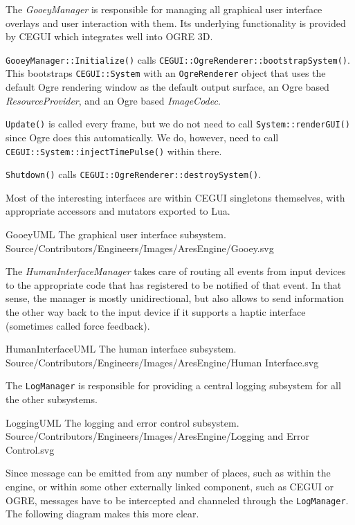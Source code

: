 \page 
{}
The {\it GooeyManager} is responsible for managing all graphical user interface overlays and user interaction with them. Its underlying functionality is provided by CEGUI which integrates well into OGRE 3D.

{\tt GooeyManager::Initialize()} calls {\tt CEGUI::OgreRenderer::bootstrapSystem()}. This bootstraps {\tt CEGUI::System} with an {\tt OgreRenderer} object that uses the default Ogre rendering window as the default output surface, an Ogre based {\it ResourceProvider}, and an Ogre based {\it ImageCodec}.

{\tt Update()} is called every frame, but we do not need to call {\tt System::renderGUI()} since Ogre does this automatically. We do, however, need to call {\tt CEGUI::System::injectTimePulse()} within there.

{\tt Shutdown()} calls {\tt CEGUI::OgreRenderer::destroySystem()}.

Most of the interesting interfaces are within CEGUI singletons themselves, with appropriate accessors and mutators exported to Lua.

\FullPageDiagram
    {GooeyUML}
    {The graphical user interface subsystem.}
    {Source/Contributors/Engineers/Images/AresEngine/Gooey.svg}

\page 
{}
The {\it HumanInterfaceManager} takes care of routing all events from input devices to the appropriate code that has registered to be notified of that event. In that sense, the manager is mostly unidirectional, but also allows to send information the other way back to the input device if it supports a haptic interface (sometimes called force feedback).

\FullPageDiagram
    {HumanInterfaceUML}
    {The human interface subsystem.}
    {Source/Contributors/Engineers/Images/AresEngine/Human Interface.svg}

\page 
{}
The {\tt LogManager} is responsible for providing a central logging subsystem for all the other subsystems.

\FullPageDiagram
    {LoggingUML}
    {The logging and error control subsystem.}
    {Source/Contributors/Engineers/Images/AresEngine/Logging and Error Control.svg}
    
Since message can be emitted from any number of places, such as within the engine, or within some other externally linked component, such as CEGUI or OGRE, messages have to be intercepted and channeled through the {\tt LogManager}. The following diagram makes this more clear.

